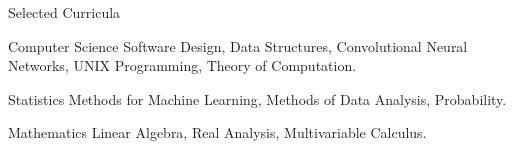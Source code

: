 \documentclass{article}
\newlength{\tabin}
\newlength{\secsep}
\newcommand{\lineunder}{\vspace*{-8pt} \\ \hspace*{-6pt} \hrulefill \\ \vspace*{-15pt}}
\newenvironment{tabbedsection}[1]{
  \begin{list}{}{
      \setlength{\itemsep}{0pt}
      \setlength{\labelsep}{0pt}
      \setlength{\labelwidth}{0pt}
      \setlength{\leftmargin}{\tabin}
      \setlength{\rightmargin}{\tabin}
      \setlength{\listparindent}{0pt}
      \setlength{\parsep}{0pt}
      \setlength{\parskip}{0pt}
      \setlength{\partopsep}{0pt}
      \setlength{\topsep}{#1}
    }
  \item[]
}{\end{list}}
\newenvironment{resume_section}[1]{
  \filbreak
  \vspace{2\secsep}
  \textsc{\large#1}
  \lineunder
  \begin{tabbedsection}{\secsep}
}{\end{tabbedsection}}
\newenvironment{resume_subsection}[2][]{
  \textbf{#2} \hfill {\footnotesize #1} \hspace{2em}
  \begin{tabbedsection}{0.5\secsep}
}{\end{tabbedsection}}
\begin{document}
  \begin{resume_section}{Selected Curricula}
    \begin{resume_subsection}[]{Computer Science}
      Software Design, Data Structures, Convolutional Neural Networks, UNIX Programming, 
      Theory of Computation.
    \end{resume_subsection}
    \begin{resume_subsection}[]{Statistics}
      Methods for Machine Learning, Methods of Data Analysis, Probability.
    \end{resume_subsection}
  \begin{resume_subsection}[]{Mathematics}
    Linear Algebra, Real Analysis, Multivariable Calculus.
    \end{resume_subsection}
  \end{resume_section}
\end{document}
